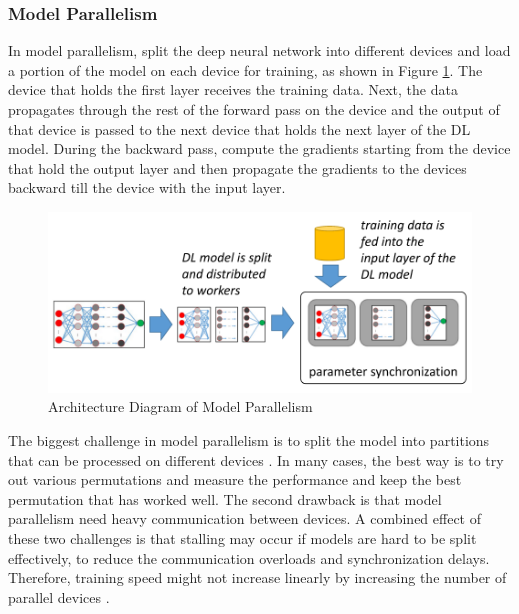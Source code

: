\subsubsection{Model Parallelism}
In model parallelism, split the deep neural network into different devices and load a portion of the model on each device for training, as shown in Figure \ref{fig:modelparallel}. The device that holds the first layer receives the training data. Next, the data propagates through the rest of the forward pass on the device and the output of that device is passed to the next device that holds the next layer of the DL model. During the backward pass, compute the gradients starting from the device that hold the output layer and then propagate the gradients to the devices backward till the device with the input layer. 

\begin{figure}[ht]
  \begin{center}
    \includegraphics[width=\textwidth]{images/model parallelism.png} 
    \caption{Architecture Diagram of Model Parallelism  \cite{Mayer2020ScalableInfrastructures}}
    \label{fig:modelparallel}
  \end{center}
\end{figure}

The biggest challenge in model parallelism is to split the model into partitions that can be processed on different devices \cite{Mayer2017ThePath}. In many cases, the best way is to try out various permutations and measure the performance and keep the best permutation that has worked well. The second drawback is that model parallelism need heavy communication between devices. A combined effect of these two challenges is that stalling may occur if models are hard to be split effectively, to reduce the communication overloads and synchronization delays. Therefore, training speed might not increase linearly by increasing the number of parallel devices \cite{Mirhoseini2017DeviceLearning}.

